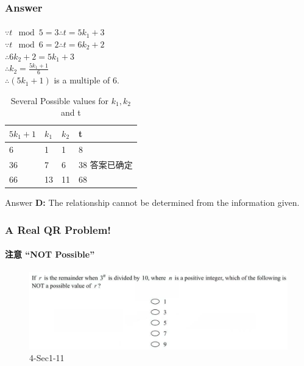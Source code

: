 \documentclass[
	11pt, %
]{beamer}
\begin{document}

\begin{frame}
	\frametitle{Answer}
	\framesubtitle{}

	$\because t \mod 5 = 3 \therefore t = 5  k_1 + 3$ \\
	$\because t \mod 6 = 2 \therefore t = 6  k_2 + 2$ \\
	$\therefore 6 k_2 + 2  = 5  k_1 + 3 $ \\
	$\therefore k_2 = \frac{5  k_1 + 1}{6}$ \\

	\bigskip
	$\therefore (5k_1 + 1)$ is a multiple of 6. 
		\begin{table}
		\begin{tabular}{l l l l}
			\toprule
			\textbf{$5  k_1 + 1$} & \textbf{$k_1$} & \textbf{$k_2$} & \textbf{t}\\
			\midrule
			6& 1 & 1 & 8 \\
			36& 7 & 6 & \alert{38} 答案已确定\\
			66& 13 & 11 & 68 \\
			\bottomrule
		\end{tabular}
		\caption{Several Possible values for $k_1, k_2$ and t}
	\end{table}

	

\bigskip
Answer \textbf{D: } The relationship cannot be determined from the information given.
\end{frame}




\begin{frame}
	\frametitle{A Real QR Problem!}
	\framesubtitle{注意 “NOT Possible”}
	\begin{figure}
		\includegraphics[width=\linewidth]{Remainder_Example_Question3.png}
		\caption{4-Sec1-11}
		\end{figure}
\end{frame}

\end{document}
